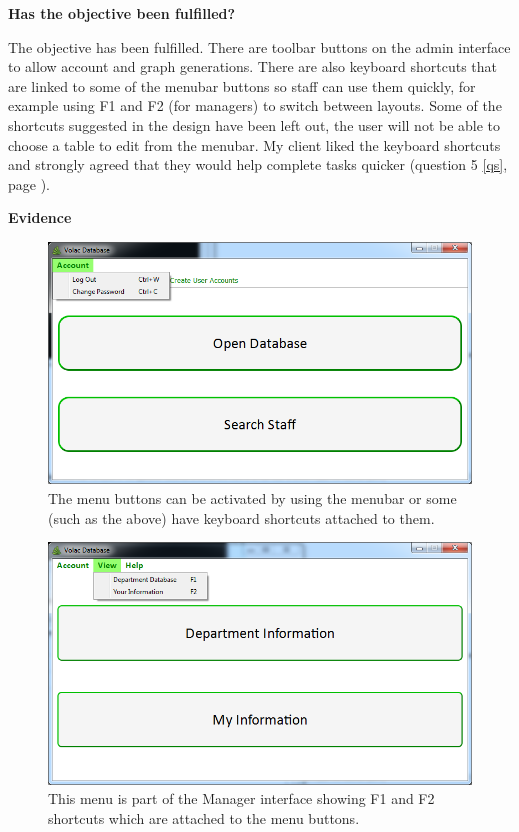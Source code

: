 \textbf{Has the objective been fulfilled?}

The objective has been fulfilled. There are toolbar buttons on the admin interface to allow account and graph generations. There are also keyboard shortcuts that are linked to some of the menubar buttons so staff can use them quickly, for example using F1 and F2 (for managers) to switch between layouts. Some of the shortcuts suggested in the design have been left out, the user will not be able to choose a table to edit from the menubar. My client liked the keyboard shortcuts and strongly agreed that they would help complete tasks quicker (question 5 \ref{qs}, page \pageref{qs}).

\textbf{Evidence}

\begin{figure}[H]
    \includegraphics[width=\textwidth]{./Evaluation/Images/shortcuts1.png}
    \caption{The menu buttons can be activated by using the menubar or some (such as the above) have keyboard shortcuts attached to them.} 
\end{figure}

\begin{figure}[H]
    \includegraphics[width=\textwidth]{./Evaluation/Images/shortcuts2.png}
    \caption{This menu is part of the Manager interface showing F1 and F2 shortcuts which are attached to the menu buttons.} 
\end{figure}


